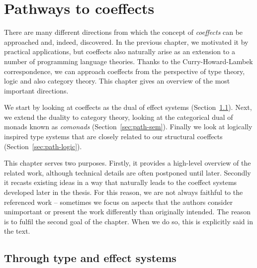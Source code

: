 

\chapter{Pathways to coeffects} 
\label{ch:pathways} 


There are many different directions from which the concept of \emph{coeffects} can be approached 
and, indeed, discovered. In the previous chapter, we motivated it by practical applications, but 
coeffects also naturally arise as an extension to a number of programming language theories.
Thanks to the Curry-Howard-Lambek correspondence, we can approach coeffects from the perspective of 
type theory, logic and also category theory. This chapter gives an overview of the most 
important directions.

We start by looking at coeffects as the dual of effect systems (Section~\ref{sec:path-eff}). Next,
we extend the duality to category theory, looking at the categorical dual of monads known as 
\emph{comonads} (Section~\ref{sec:path-sem}). Finally we look at logically inspired type systems 
that are closely related to our structural coeffects (Section~\ref{sec:path-logic}).

This chapter serves two purposes. Firstly, it provides a high-level overview of the  related work, 
although technical details are often postponed until later. Secondly it recasts existing ideas in 
a way that naturally leads to the coeffect systems developed later in the thesis. For this reason, 
we are not always faithful to the referenced work -- sometimes we focus on aspects that the 
authors consider unimportant or present the work differently than originally intended. The reason 
is to fulfil the second goal of the chapter. When we do so, this is explicitly said in the text.


\section{Through type and effect systems}
\label{sec:path-eff}

